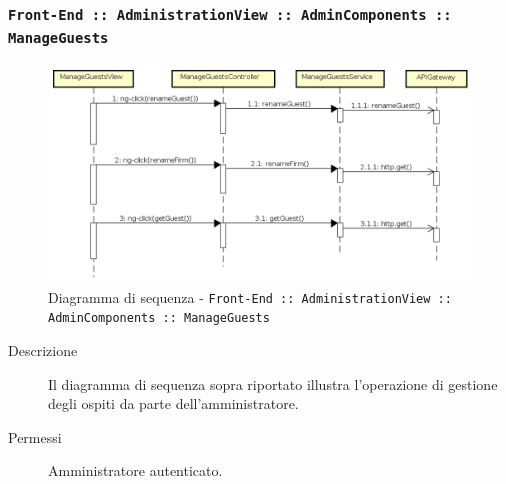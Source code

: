 \documentclass[../DefinizioneDiProdotto_v2.0.0.tex]{subfiles}
\begin{document}
\subsubsection{\texttt{Front-End :: AdministrationView :: AdminComponents :: ManageGuests}}
\begin{figure}[!h]
	\centering
	\includegraphics[scale=0.3]{DiagrammiSequenza/Front-End/AdministrationView/ManageGuests.png}
	\caption{Diagramma di sequenza - \texttt{Front-End :: AdministrationView :: AdminComponents :: ManageGuests }}
\end{figure}
\begin{description}
	\item [Descrizione] Il diagramma di sequenza sopra riportato illustra l'operazione di gestione degli ospiti da parte dell'amministratore.
	\item [Permessi] Amministratore autenticato.
\end{description}

\newpage
\end{document}
